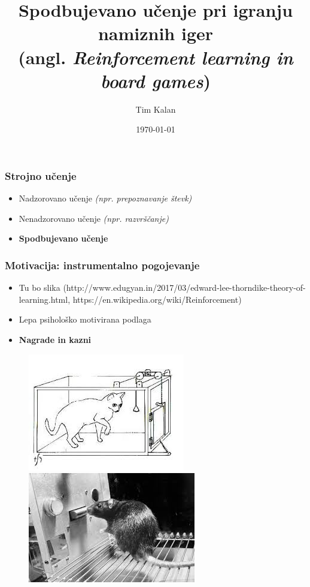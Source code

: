 \documentclass{beamer}    %
\author{Tim Kalan}
\institute[FMF]{Fakulteta za matematiko in fiziko}
\title{
    Spodbujevano učenje pri igranju namiznih iger \\ 
    \large (angl. \textit{Reinforcement learning in board games})}
\date{\today}
\begin{document}
\begin{frame}
    \titlepage
\end{frame}


\begin{frame}
    \frametitle{Strojno učenje}
    \begin{itemize}
        \item Nadzorovano učenje \textit{(npr. prepoznavanje števk)}
        \item Nenadzorovano učenje \textit{(npr. razvrščanje)}
        \item \textbf{Spodbujevano učenje}
    \end{itemize}
\end{frame}


\begin{frame}
    \frametitle{Motivacija: instrumentalno pogojevanje}
    \begin{itemize}
        \item Tu bo slika 
        (http://www.edugyan.in/2017/03/edward-lee-thorndike-theory-of-learning.html, 
        https://en.wikipedia.org/wiki/Reinforcement)
        \item Lepa psihološko motivirana podlaga
        \item \textbf{Nagrade in kazni} 
    \end{itemize}

    \begin{figure}[b]
        \includegraphics[scale=0.6]{slike/macka.jpg}
        \includegraphics[scale=0.5]{slike/miska.jpg}
    \end{figure}
\end{frame}
\end{document}
